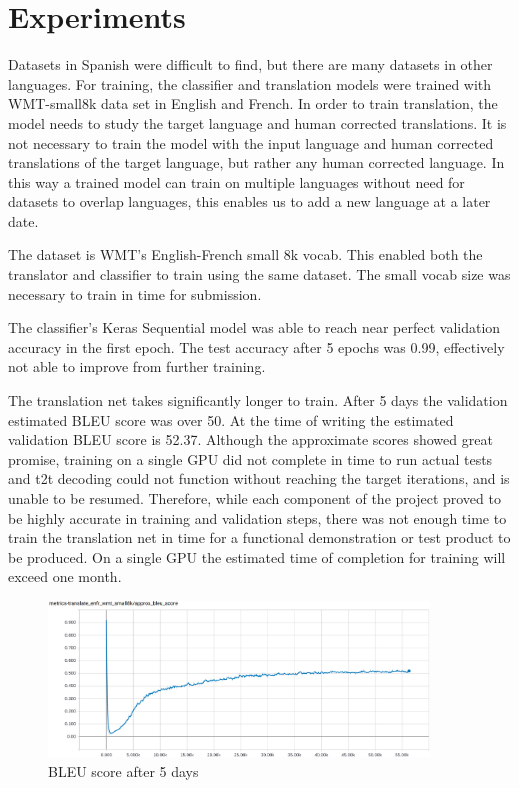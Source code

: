 \documentclass[10pt,a4paper]{article}
\begin{document}
\clearpage


\section{Experiments}


  Datasets in Spanish were difficult to find, but there are many datasets in other languages. For training, the classifier and translation models were trained with WMT-small8k data set in English and French. In order to train translation, the model needs to study the target language and human corrected translations. It is not necessary to train the model with the input language and human corrected translations of the target language, but rather any human corrected language. In this way a trained model can train on multiple languages without need for datasets to overlap languages, this enables us to add a new language at a later date.


  The dataset is WMT's English-French small 8k vocab. This enabled both the translator and classifier to train using the same dataset. The small vocab size was necessary to train in time for submission.
  
 
  The classifier's Keras Sequential model was able to reach near perfect validation accuracy in the first epoch. The test accuracy after 5 epochs was 0.99, effectively not able to improve from further training.
  
  
  The translation net takes significantly longer to train. After 5 days the validation estimated BLEU score was over 50. At the time of writing the estimated validation BLEU score is 52.37. Although the approximate scores showed great promise, training on a single GPU did not complete in time to run actual tests and t2t decoding could not function without reaching the target iterations, and is unable to be resumed. Therefore, while each component of the project proved to be highly accurate in training and validation steps, there was not enough time to train the translation net in time for a functional demonstration or test product to be produced. On a single GPU the estimated time of completion for training will exceed one month.
  
\begin{figure}[H]
  \begin{center}
    \includegraphics[width=0.9\textwidth] {BLEU.png}
    \caption{BLEU score after 5 days}
  \end{center}
\end{figure}
\end{document}
